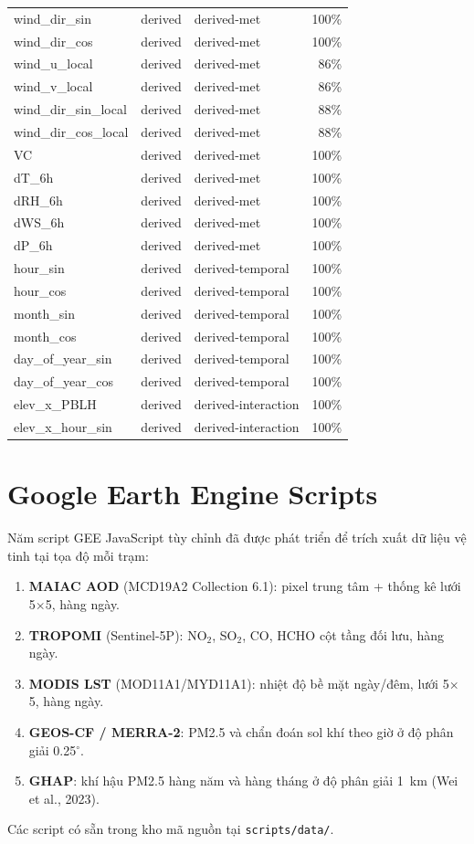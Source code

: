 \documentclass[../DoAn.tex]{subfiles}
\begin{document}
{\begin{longtable}{p{4cm}lp{3cm}r}
  wind\_dir\_sin & derived & derived-met & 100\% \\
  wind\_dir\_cos & derived & derived-met & 100\% \\
  wind\_u\_local & derived & derived-met & 86\% \\
  wind\_v\_local & derived & derived-met & 86\% \\
  wind\_dir\_sin\_local & derived & derived-met & 88\% \\
  wind\_dir\_cos\_local & derived & derived-met & 88\% \\
  VC & derived & derived-met & 100\% \\
  dT\_6h & derived & derived-met & 100\% \\
  dRH\_6h & derived & derived-met & 100\% \\
  dWS\_6h & derived & derived-met & 100\% \\
  dP\_6h & derived & derived-met & 100\% \\
  hour\_sin & derived & derived-temporal & 100\% \\
  hour\_cos & derived & derived-temporal & 100\% \\
  month\_sin & derived & derived-temporal & 100\% \\
  month\_cos & derived & derived-temporal & 100\% \\
  day\_of\_year\_sin & derived & derived-temporal & 100\% \\
  day\_of\_year\_cos & derived & derived-temporal & 100\% \\
  elev\_x\_PBLH & derived & derived-interaction & 100\% \\
  elev\_x\_hour\_sin & derived & derived-interaction & 100\% \\
\bottomrule
\end{longtable}
}

\section{Google Earth Engine Scripts}

Năm script GEE JavaScript tùy chỉnh đã được phát triển để trích xuất dữ liệu vệ tinh tại tọa độ mỗi trạm:

\begin{enumerate}
\item \textbf{MAIAC AOD} (MCD19A2 Collection 6.1): pixel trung tâm + thống kê lưới 5$\times$5, hàng ngày.
\item \textbf{TROPOMI} (Sentinel-5P): NO$_2$, SO$_2$, CO, HCHO cột tầng đối lưu, hàng ngày.
\item \textbf{MODIS LST} (MOD11A1/MYD11A1): nhiệt độ bề mặt ngày/đêm, lưới 5$\times$5, hàng ngày.
\item \textbf{GEOS-CF / MERRA-2}: PM2.5 và chẩn đoán sol khí theo giờ ở độ phân giải 0.25$^\circ$.
\item \textbf{GHAP}: khí hậu PM2.5 hàng năm và hàng tháng ở độ phân giải 1~km (Wei et al., 2023).
\end{enumerate}

Các script có sẵn trong kho mã nguồn tại \texttt{scripts/data/}.
\end{document}
